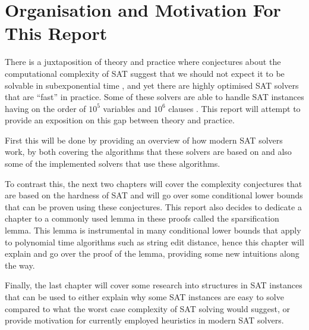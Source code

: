 \section{Organisation and Motivation For This Report}  %
There is a juxtaposition of theory and practice where conjectures about the computational complexity of
SAT suggest that we should not expect it to be solvable in subexponential time \cite{impagliazzo2001complexity},
and yet there are highly optimised SAT solvers that are ``fast'' in practice. Some
of these solvers are able to handle SAT instances having on the order of $10^5$ variables
and $10^6$ clauses \cite{SAT_Comp2017, sat2018descriptions}.
This report will attempt to provide an exposition on this
gap between theory and practice. 

First this will be done by providing an overview of how modern SAT solvers work,
by both covering the algorithms that these solvers are based on and also some
of the implemented solvers that use these algorithms.

To contrast this, the next two chapters will cover the complexity conjectures
that are based on the hardness of SAT and will go over some conditional lower bounds that can be
proven using these conjectures. This report also decides to dedicate a chapter to a commonly used lemma
in these proofs called the sparsification lemma. This lemma is instrumental in many
conditional lower bounds that apply to polynomial time algorithms such as string edit distance, hence
this chapter will explain and go over the proof of the lemma, providing some new intuitions along the way.

Finally, the last chapter will cover some research into structures in SAT instances
that can be used to either explain why some SAT instances are easy to solve compared to what
the worst case complexity of SAT solving would suggest, or provide motivation for currently employed
heuristics in modern SAT solvers.

